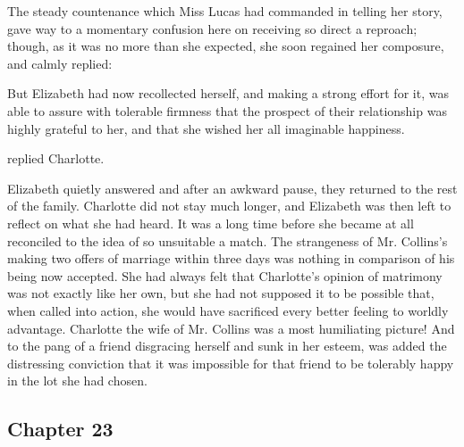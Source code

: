 
The steady countenance which Miss Lucas had commanded in telling her story, gave way to a momentary confusion here on receiving so direct a reproach; though, as it was no more than she expected, she soon regained her composure, and calmly replied:


But Elizabeth had now recollected herself, and making a strong effort for it, was able to assure with tolerable firmness that the prospect of their relationship was highly grateful to her, and that she wished her all imaginable happiness.

 replied Charlotte. 

Elizabeth quietly answered  and after an awkward pause, they returned to the rest of the family. Charlotte did not stay much longer, and Elizabeth was then left to reflect on what she had heard. It was a long time before she became at all reconciled to the idea of so unsuitable a match. The strangeness of Mr. Collins's making two offers of marriage within three days was nothing in comparison of his being now accepted. She had always felt that Charlotte's opinion of matrimony was not exactly like her own, but she had not supposed it to be possible that, when called into action, she would have sacrificed every better feeling to worldly advantage. Charlotte the wife of Mr. Collins was a most humiliating picture! And to the pang of a friend disgracing herself and sunk in her esteem, was added the distressing conviction that it was impossible for that friend to be tolerably happy in the lot she had chosen.

\subsection[chapter-23]{\useURL[url23][][][]\from[url23] Chapter 23}

